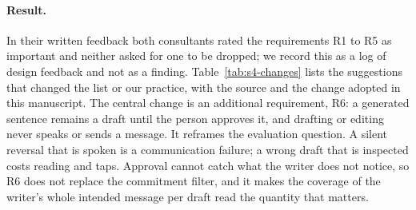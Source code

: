 \paragraph{Result.}
In their written feedback both consultants rated the requirements R1 to R5 as important and neither asked for one to be dropped; we record this as a log of design feedback and not as a finding.
Table~\ref{tab:s4-changes} lists the suggestions that changed the list or our practice, with the source and the change adopted in this manuscript.
The central change is an additional requirement, R6: a generated sentence remains a draft until the person approves it, and drafting or editing never speaks or sends a message.
It reframes the evaluation question.
A silent reversal that is spoken is a communication failure; a wrong draft that is inspected costs reading and taps.
Approval cannot catch what the writer does not notice, so R6 does not replace the commitment filter, and it makes the coverage of the writer's whole intended message per draft read the quantity that matters.

